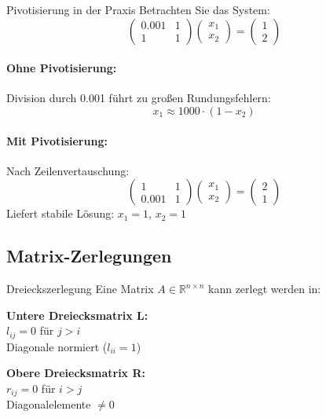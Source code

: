 \begin{example2}{Pivotisierung in der Praxis}
Betrachten Sie das System:
$$\begin{pmatrix}
0.001 & 1\\
1 & 1
\end{pmatrix}
\begin{pmatrix}
x_1\\
x_2
\end{pmatrix} = 
\begin{pmatrix}
1\\
2
\end{pmatrix}$$

\paragraph{Ohne Pivotisierung:}
Division durch 0.001 führt zu großen Rundungsfehlern:
$$x_1 \approx 1000 \cdot (1 - x_2)$$

\paragraph{Mit Pivotisierung:}
Nach Zeilenvertauschung:
$$\begin{pmatrix}
1 & 1\\
0.001 & 1
\end{pmatrix}
\begin{pmatrix}
x_1\\
x_2
\end{pmatrix} = 
\begin{pmatrix}
2\\
1
\end{pmatrix}$$
Liefert stabile Lösung: $x_1 = 1$, $x_2 = 1$
\end{example2}



\subsection{Matrix-Zerlegungen}

\begin{definition}{Dreieckszerlegung}
Eine Matrix $A \in \mathbb{R}^{n\times n}$ kann zerlegt werden in:
\vspace{1mm}\\
\begin{minipage}[t]{0.5\textwidth}
    \textbf{Untere Dreiecksmatrix L:}\\
    $l_{ij} = 0$ für $j > i$\\
    Diagonale normiert ($l_{ii}=1$)
\end{minipage}
\hspace{3mm}
\begin{minipage}[t]{0.45\textwidth}
    \textbf{Obere Dreiecksmatrix R:}\\
    $r_{ij} = 0$ für $i > j$\\
    Diagonalelemente $\neq 0$
\end{minipage}
\end{definition}



